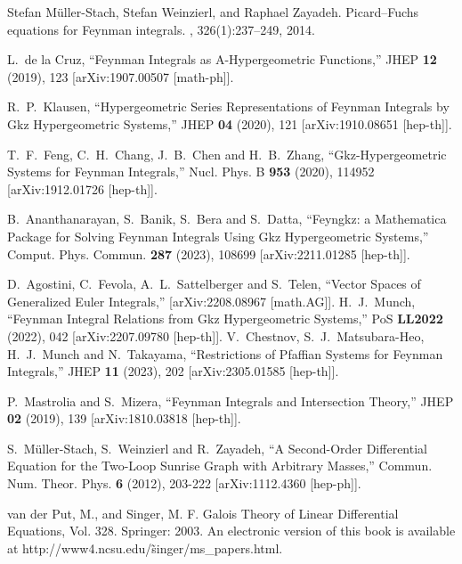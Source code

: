 \documentclass[a4paper,12pt]{article}
\numberwithin{equation}{section}
\numberwithin{figure}{section}
\begin{document}
\begin{thebibliography}{99}
Stefan M{\"u}ller-Stach, Stefan Weinzierl, and Raphael Zayadeh.
\newblock Picard--{F}uchs equations for {F}eynman integrals.
,
326(1):237--249, 2014.
\newblock [arXiv:1212.4389]
  
L.~de la Cruz,
``Feynman Integrals as A-Hypergeometric Functions,''
JHEP \textbf{12} (2019), 123
[arXiv:1907.00507 [math-ph]].

R.~P.~Klausen,
``Hypergeometric Series Representations of Feynman Integrals by Gkz Hypergeometric Systems,''
JHEP \textbf{04} (2020), 121
[arXiv:1910.08651 [hep-th]].
  
T.~F.~Feng, C.~H.~Chang, J.~B.~Chen and H.~B.~Zhang,
``Gkz-Hypergeometric Systems for Feynman Integrals,''
Nucl. Phys. B \textbf{953} (2020), 114952
[arXiv:1912.01726 [hep-th]].

B.~Ananthanarayan, S.~Banik, S.~Bera and S.~Datta,
``Feyngkz: a Mathematica Package for Solving Feynman Integrals Using Gkz Hypergeometric Systems,''
Comput. Phys. Commun. \textbf{287} (2023), 108699
[arXiv:2211.01285 [hep-th]].

D.~Agostini, C.~Fevola, A.~L.~Sattelberger and S.~Telen,
``Vector Spaces of Generalized Euler Integrals,''
[arXiv:2208.08967 [math.AG]].
H.~J.~Munch,
``Feynman Integral Relations from Gkz Hypergeometric Systems,''
PoS \textbf{LL2022} (2022), 042
[arXiv:2207.09780 [hep-th]].
V.~Chestnov, S.~J.~Matsubara-Heo, H.~J.~Munch and N.~Takayama,
``Restrictions of Pfaffian Systems for Feynman Integrals,''
JHEP \textbf{11} (2023), 202
[arXiv:2305.01585 [hep-th]].

P.~Mastrolia and S.~Mizera,
``Feynman Integrals and Intersection Theory,''
JHEP \textbf{02} (2019), 139
[arXiv:1810.03818 [hep-th]].

S.~M\"uller-Stach, S.~Weinzierl and R.~Zayadeh,
``A Second-Order Differential Equation for the Two-Loop Sunrise Graph with Arbitrary Masses,''
Commun. Num. Theor. Phys. \textbf{6} (2012), 203-222
[arXiv:1112.4360 [hep-ph]].

  
 van der Put, M., and Singer, M. F. Galois Theory of Linear Differential Equations, Vol. 328. Springer: 2003. An electronic version of this book is available at http://www4.ncsu.edu/\~singer/ms\_papers.html.


\end{thebibliography}
\end{document}
